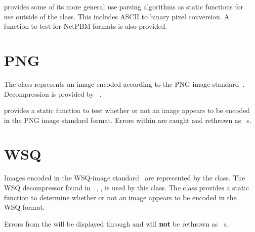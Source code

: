  provides some of its more general use parsing algorithms as
static functions for use outside of the class.  This includes ASCII to binary
pixel conversion.  A function to test for NetPBM formats is also provided.

\section{PNG}
\label{sec-image-png}
The  class represents an image encoded according to the PNG image 
standard~\cite{png}.  Decompression is provided by 
~\cite{libpng}.

 provides a static function to test whether or not an image appears
to be encoded in the PNG image standard format.  Errors within 
are caught and rethrown as ~s.

\section{WSQ}
\label{sec-image-wsq}
Images encoded in the WSQ-image standard~\cite{std:wsq} are represented by the 
 class.  The WSQ decompressor found in \nbis~\cite{nist:nbis}, 
, is used by this class.  The class provides a static function to determine whether or not an image appears to be encoded in the WSQ format.

Errors from the  will be displayed through 
and will {\bf not} be rethrown as ~s.
